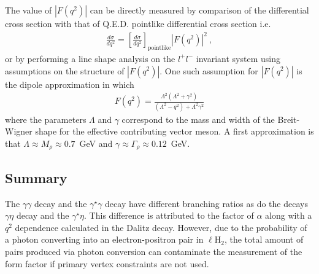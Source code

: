The value of $\left|F(q^2)\right|$ can be directly measured by comparison of the differential cross section with that of Q.E.D. pointlike differential cross section i.e.
\begin{align}
\frac{d\sigma}{dq^{2}} = \left[\frac{d\sigma}{dq^{2}}\right]_{\text{pointlike}}\left| F(q^{2})\right| ^{2}\nonumber \ ,
\end{align}
or by performing a line shape analysis on the $l^{+}l^{-}$ invariant system using assumptions on the structure of $\left|F(q^2)\right|$. One such assumption for $\left|F(q^2)\right|$ is the dipole approximation in which 
\begin{align}
F(q^{2}) = \frac{\Lambda^2(\Lambda^2 + \gamma^2)}{(\Lambda^{2} - q^2) + \Lambda^2\gamma^2 } \nonumber
\end{align}
where the parameters $\Lambda$ and $\gamma$ correspond to the mass and width of the Breit-Wigner shape for the effective contributing vector meson. A first approximation is that $\Lambda \approx M_{\rho} \approx 0.7$~GeV and $\gamma \approx \Gamma_{\rho}  \approx 0.12$~GeV.
\subsection{Summary}
The $\gamma \gamma$ decay and the $\gamma^\star \gamma$ decay have different branching ratios as do the decays $\gamma \eta$ decay and the $\gamma^\star \eta$. This difference is attributed to the factor of $\alpha$ along with a $q^2$ dependence calculated in the Dalitz decay. However, due to the probability of a photon converting into an electron-positron pair in $\ell$H$_2$, the total amount of \epem pairs produced via photon conversion can contaminate the measurement of the form factor if primary vertex constraints are not used.
 